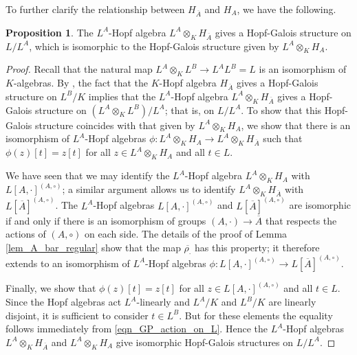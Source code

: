 \documentclass[12pt,a4paper, reqno]{amsart}
\theoremstyle{definition}
\newtheorem{proposition}[theorem]{Proposition}
\begin{document}
To further clarify the relationship between $ H_{\overline{A}} $ and $ H_{A} $, we have the following. 

\begin{proposition} \label{prop_H_A_vs_H_A_bar}
The $ L^{A} $-Hopf algebra $ L^{A} \otimes_{K} H_{\overline{A}} $ gives a Hopf-Galois structure on $ L/L^{A} $, which is isomorphic to the Hopf-Galois structure given by $ L^{A} \otimes_{K} H_{A} $.
\end{proposition}
\begin{proof}
Recall that the natural map $ L^{A} \otimes_{K} L^{B} \rightarrow L^{A}L^{B} = L $ is an isomorphism of $ K $-algebras. By \cite[(2.11)]{TWE}, the fact that the $ K $-Hopf algebra $ H_{\overline{A}} $ gives a Hopf-Galois structure on $ L^{B}/K $ implies that the $ L^{A} $-Hopf algebra $ L^{A} \otimes_{K} H_{\overline{A}} $ gives a Hopf-Galois structure on $ (L^{A} \otimes_{K} L^{B}) / L^{A} $; that is, on $ L/L^{A} $. To show that this Hopf-Galois structure coincides with that given by $ L^{A} \otimes_{K} H_{A} $, we show that there is an isomorphism of $ L^{A} $-Hopf algebras $ \phi : L^{A} \otimes_{K} H_{A} \rightarrow L^{A} \otimes_{K} H_{\overline{A}}  $ such that $ \phi(z)[t] = z[t] $ for all $ z \in L^{A} \otimes_{K} H_{A} $ and all $ t \in L $.

We have seen that we may identify the $ L^{A} $-Hopf algebra $ L^{A} \otimes_{K} H_{A} $ with $ L[A,\cdot]^{(A,\circ)} $; a similar argument allows us to identify $ L^{A} \otimes_{K} H_{\overline{A}} $ with $ L[\overline{A}]^{(A,\circ)} $. The $ L^{A} $-Hopf algebras $ L[A,\cdot]^{(A,\circ)} $ and $ L[\overline{A}]^{(A,\circ)} $ are isomorphic if and only if there is an isomorphism of groups $ (A,\cdot) \rightarrow \overline{A} $ that respects the actions of $ (A,\circ) $ on each side. The details of the proof of Lemma \ref{lem_A_bar_regular} show that the map $ \overline{\rho_{\cdot}} $ has this property; it therefore extends to an isomorphism of $ L^{A} $-Hopf algebras $ \phi : L[A,\cdot]^{(A,\circ)} \rightarrow L[\overline{A}]^{(A,\circ)} $. 

Finally, we show that $ \phi(z)[t] = z[t] $ for all $ z \in L[A,\cdot]^{(A,\circ)} $ and all $ t \in L $. Since the Hopf algebras act $ L^{A} $-linearly and  $ L^{A}/K $ and $ L^{B}/K $ are linearly disjoint, it is sufficient to consider $ t \in L^{B} $. But for these elements the equality follows immediately from \eqref{eqn_GP_action_on_L}. Hence the $ L^{A} $-Hopf algebras 
$ L^{A} \otimes_{K} H_{\overline{A}} $ and $ L^{A} \otimes_{K} H_{A} $ give isomorphic Hopf-Galois structures on $ L/L^{A} $.  
\end{proof}
\end{document}
